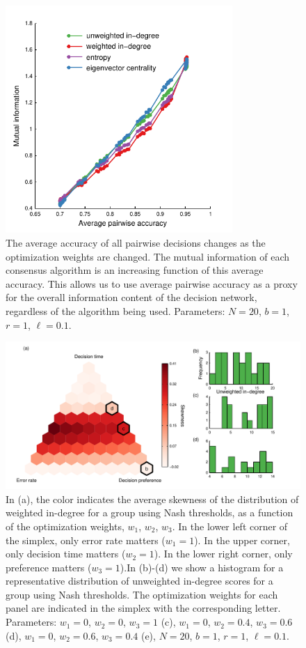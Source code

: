\documentclass{article}
\begin{document}
\begin{figure}[ht]
\includegraphics[width=3.4in]{mutinfo_vs_accuracy.pdf}
\caption{\label{mutinfo_vs_acc} The average accuracy of all pairwise decisions changes as the optimization weights are changed. The mutual information of each consensus algorithm is an increasing function of this average accuracy.  This allows us to use average pairwise accuracy as a proxy for the overall information content of the decision network, regardless of the algorithm being used. Parameters: $N=20$, $b=1$, $r=1$, $\ell=0.1$. }
\end{figure}

\begin{figure}[ht]
\includegraphics[width=6.83in]{skewness_histograms.pdf}
\caption{\label{histograms} In (a), the color indicates the average skewness of the distribution of weighted in-degree for a group using Nash thresholds, as a function of the optimization weights, $w_1$, $w_2$, $w_3$. In the lower left corner of the simplex, only error rate matters ($w_1=1$).  In the upper corner, only decision time matters ($w_2=1$).  In the lower right corner, only preference matters ($w_3=1$).In (b)-(d) we show a histogram for a representative distribution of unweighted in-degree scores for a group using Nash thresholds. The optimization weights for each panel are indicated in the simplex with the corresponding letter.  Parameters: $w_1=0$, $w_2=0$, $w_3=1$ (c), $w_1=0$, $w_2=0.4$, $w_3=0.6$ (d), $w_1=0$, $w_2=0.6$, $w_3=0.4$ (e),  $N=20$, $b=1$, $r=1$, $\ell=0.1$.}
\end{figure}
\end{document}
